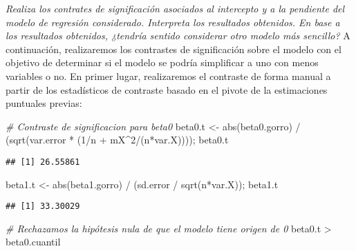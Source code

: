 \documentclass[
]{article}
\newenvironment{Shaded}{\begin{snugshade}}{\end{snugshade}}
\newcommand{\CommentTok}[1]{\textcolor[rgb]{0.56,0.35,0.01}{\textit{#1}}}
\newcommand{\DecValTok}[1]{\textcolor[rgb]{0.00,0.00,0.81}{#1}}
\newcommand{\FunctionTok}[1]{\textcolor[rgb]{0.00,0.00,0.00}{#1}}
\newcommand{\NormalTok}[1]{#1}
\newcommand{\OtherTok}[1]{\textcolor[rgb]{0.56,0.35,0.01}{#1}}
\newcommand{\SpecialCharTok}[1]{\textcolor[rgb]{0.00,0.00,0.00}{#1}}
\begin{document}
\textit{Realiza los contrates de significación asociados al intercepto y a la pendiente del
modelo de regresión considerado. Interpreta los resultados obtenidos. En base a
los resultados obtenidos, ¿tendría sentido considerar otro modelo más sencillo?}
A continuación, realizaremos los contrastes de significación sobre el
modelo con el objetivo de determinar si el modelo se podría simplificar
a uno con menos variables o no. En primer lugar, realizaremos el
contraste de forma manual a partir de los estadísticos de contraste
basado en el pivote de la estimaciones puntuales previas:

\begin{Shaded}
\begin{Highlighting}[]
\CommentTok{\# Contraste de significacion para beta0}
\NormalTok{beta0.t }\OtherTok{\textless{}{-}} \FunctionTok{abs}\NormalTok{(beta0.gorro) }\SpecialCharTok{/}\NormalTok{ (}\FunctionTok{sqrt}\NormalTok{(var.error }\SpecialCharTok{*}\NormalTok{ (}\DecValTok{1}\SpecialCharTok{/}\NormalTok{n }\SpecialCharTok{+}\NormalTok{ mX}\SpecialCharTok{\^{}}\DecValTok{2}\SpecialCharTok{/}\NormalTok{(n}\SpecialCharTok{*}\NormalTok{var.X)))); beta0.t}
\end{Highlighting}
\end{Shaded}

\begin{verbatim}
## [1] 26.55861
\end{verbatim}

\begin{Shaded}
\begin{Highlighting}[]
\NormalTok{beta1.t }\OtherTok{\textless{}{-}} \FunctionTok{abs}\NormalTok{(beta1.gorro) }\SpecialCharTok{/}\NormalTok{ (sd.error }\SpecialCharTok{/} \FunctionTok{sqrt}\NormalTok{(n}\SpecialCharTok{*}\NormalTok{var.X)); beta1.t}
\end{Highlighting}
\end{Shaded}

\begin{verbatim}
## [1] 33.30029
\end{verbatim}

\begin{Shaded}
\begin{Highlighting}[]
\CommentTok{\# Rechazamos la hipótesis nula de que el modelo tiene origen de 0}
\NormalTok{beta0.t }\SpecialCharTok{\textgreater{}}\NormalTok{ beta0.cuantil }
\end{Highlighting}
\end{Shaded}
\end{document}
